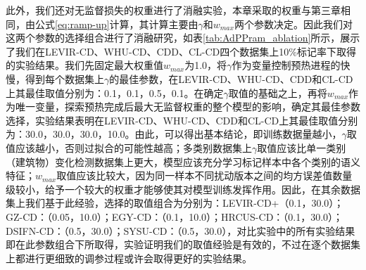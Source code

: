 \documentclass[lang=chs, degree=master, blindreview=false, adobe=false]{yanputhesis}
\begin{document}
此外，我们还对无监督损失的权重进行了消融实验，本章采取的权重与第三章相同，由公式\ref{eq:ramp-up}计算，其计算主要由$\gamma$和$w_{max}$两个参数决定。因此我们对这两个参数的选择组合进行了消融研究，如表\ref{tab:AdPPram_ablation}所示，展示了我们在LEVIR-CD、WHU-CD、CDD、CL-CD四个数据集上10$\%$标记率下取得的实验结果。我们先固定最大权重值$w_{max}$为1.0，将$\gamma$作为变量控制预热进程的快慢，得到每个数据集上$\gamma$的最佳参数，在LEVIR-CD、WHU-CD、CDD和CL-CD上其最佳取值分别为：0.1，0.1，0.5，0.1。在确定$\gamma$取值的基础之上，再将$w_{max}$作为唯一变量，探索预热完成后最大无监督权重的整个模型的影响，确定其最佳参数选择，实验结果表明在LEVIR-CD、WHU-CD、CDD和CL-CD上其最佳取值分别为：30.0，30.0，30.0，10.0。由此，可以得出基本结论，即训练数据量越小，$\gamma$取值应该越小，否则过拟合的可能性越高；多类别数据集上$\gamma$取值应该比单一类别（建筑物）变化检测数据集上更大，模型应该充分学习标记样本中各个类别的语义特征；$w_{max}$取值应该比较大，因为同一样本不同扰动版本之间的均方误差值数量级较小，给予一个较大的权重才能够使其对模型训练发挥作用。因此，在其余数据集上我们基于此经验，选择的取值组合为分别为：LEVIR-CD+（0.1，30.0）；GZ-CD：（0.05，10.0）；EGY-CD：（0.1，10.0）；HRCUS-CD：（0.1，30.0）；DSIFN-CD：（0.5，30.0）；SYSU-CD：（0.5，30.0），对比实验中的所有实验结果即在此参数组合下所取得，实验证明我们的取值经验是有效的，不过在逐个数据集上都进行更细致的调参过程或许会取得更好的实验结果。
\end{document}
